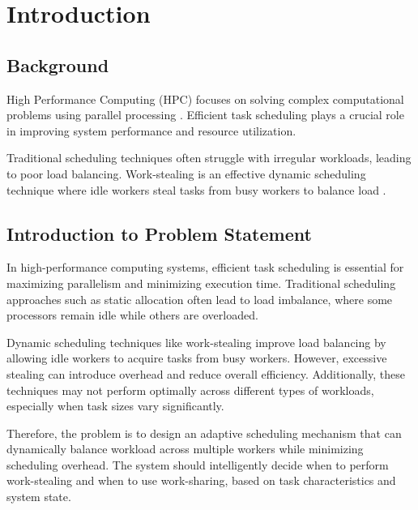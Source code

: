 \documentclass[12pt,a4paper]{article}
\begin{document}

\renewcommand*\contentsname{Table of Contents}
\tableofcontents
\listoffigures
\listoftables
\newpage
{}
   
\section{Introduction}

\subsection{Background}

High Performance Computing (HPC) focuses on solving complex computational problems using parallel processing \cite{quinn2004parallel}. Efficient task scheduling plays a crucial role in improving system performance and resource utilization.

Traditional scheduling techniques often struggle with irregular workloads, leading to poor load balancing. Work-stealing is an effective dynamic scheduling technique where idle workers steal tasks from busy workers to balance load \cite{blumofe1999scheduling}.

\subsection{Introduction to Problem Statement}

In high-performance computing systems, efficient task scheduling is essential for maximizing parallelism and minimizing execution time. Traditional scheduling approaches such as static allocation often lead to load imbalance, where some processors remain idle while others are overloaded.

Dynamic scheduling techniques like work-stealing improve load balancing by allowing idle workers to acquire tasks from busy workers. However, excessive stealing can introduce overhead and reduce overall efficiency. Additionally, these techniques may not perform optimally across different types of workloads, especially when task sizes vary significantly.

Therefore, the problem is to design an adaptive scheduling mechanism that can dynamically balance workload across multiple workers while minimizing scheduling overhead. The system should intelligently decide when to perform work-stealing and when to use work-sharing, based on task characteristics and system state.
\end{document}
